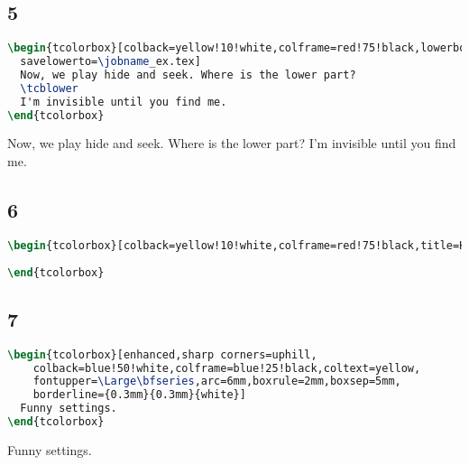 \documentclass{ctexart}
\begin{document}
\subsection{5}
\begin{lstlisting}[language={TeX}]
\begin{tcolorbox}[colback=yellow!10!white,colframe=red!75!black,lowerbox=invisible,
  savelowerto=\jobname_ex.tex]
  Now, we play hide and seek. Where is the lower part?
  \tcblower
  I'm invisible until you find me.
\end{tcolorbox}
\end{lstlisting}
\begin{tcolorbox}[colback=yellow!10!white,colframe=red!75!black,lowerbox=invisible,
  savelowerto=\jobname_ex.tex]
  Now, we play hide and seek. Where is the lower part?
  \tcblower
  I'm invisible until you find me.
\end{tcolorbox}

\subsection{6}
\begin{lstlisting}[language={TeX}]
\begin{tcolorbox}[colback=yellow!10!white,colframe=red!75!black,title=Here I am]
  
\end{tcolorbox}
\end{lstlisting}
\begin{tcolorbox}[colback=yellow!10!white,colframe=red!75!black,title=Here I am]
  
\end{tcolorbox}

\subsection{7}
\begin{lstlisting}[language={TeX}]
\begin{tcolorbox}[enhanced,sharp corners=uphill,
    colback=blue!50!white,colframe=blue!25!black,coltext=yellow,
    fontupper=\Large\bfseries,arc=6mm,boxrule=2mm,boxsep=5mm,
    borderline={0.3mm}{0.3mm}{white}]
  Funny settings.
\end{tcolorbox}
\end{lstlisting}
\begin{tcolorbox}[enhanced,sharp corners=uphill,
    colback=blue!50!white,colframe=blue!25!black,coltext=yellow,
    fontupper=\Large\bfseries,arc=6mm,boxrule=2mm,boxsep=5mm,
    borderline={0.3mm}{0.3mm}{white}]
  Funny settings.
\end{tcolorbox}
\end{document}
